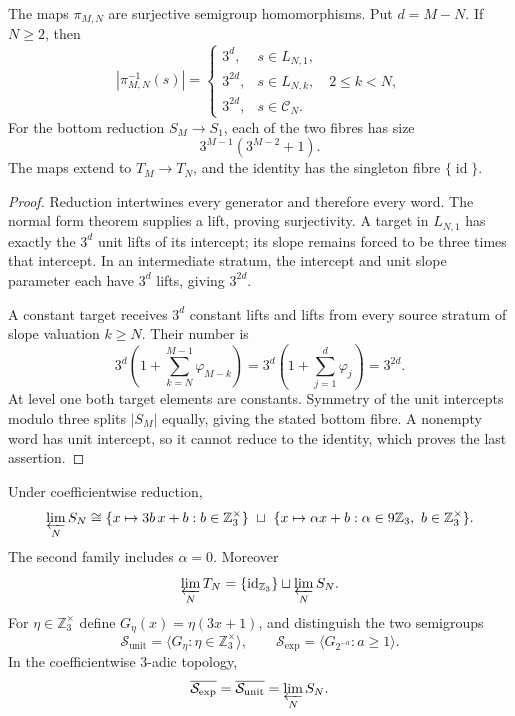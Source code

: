 \begin{theorem}
\label{thm:finite-residue-reduction-fibres}
The maps $\pi_{M,N}$ are surjective semigroup homomorphisms.  Put $d=M-N$.
If $N\geq2$, then
\begin{equation}
\label{eq:finite-residue-general-fibres}
 |\pi_{M,N}^{-1}(s)|=
 \begin{cases}
  3^d,&s\in L_{N,1},\\
  3^{2d},&s\in L_{N,k},\quad2\leq k<N,\\
  3^{2d},&s\in\mathcal C_N.
 \end{cases}
\end{equation}
For the bottom reduction $S_M\to S_1$, each of the two fibres has size
\[
 3^{M-1}(3^{M-2}+1).
\]
The maps extend to $T_M\to T_N$, and the identity has the singleton fibre
$\{\operatorname{id}\}$.
\end{theorem}

\begin{proof}
Reduction intertwines every generator and therefore every word.  The normal
form theorem supplies a lift, proving surjectivity.  A target in $L_{N,1}$
has exactly the $3^d$ unit lifts of its intercept; its slope remains forced to
be three times that intercept.  In an intermediate stratum, the intercept
and unit slope parameter each have $3^d$ lifts, giving $3^{2d}$.

A constant target receives $3^d$ constant lifts and lifts from every source
stratum of slope valuation $k\geq N$.  Their number is
\[
 3^d\left(1+\sum_{k=N}^{M-1}\varphi_{M-k}\right)
 =3^d\left(1+\sum_{j=1}^{d}\varphi_j\right)=3^{2d}.
\]
At level one both target elements are constants.  Symmetry of the unit
intercepts modulo three splits $|S_M|$ equally, giving the stated bottom
fibre.  A nonempty word has unit intercept, so it cannot reduce to the
identity, which proves the last assertion.
\end{proof}

\begin{theorem}
\label{thm:finite-residue-inverse-limit}
Under coefficientwise reduction,
\begin{equation}
\label{eq:finite-residue-inverse-limit}
 \varprojlim_N S_N
 \cong
 \{x\mapsto3b\,x+b:b\in\mathbb Z_3^\times\}
 \ \sqcup\
 \{x\mapsto\alpha x+b:
       \alpha\in9\mathbb Z_3,\ b\in\mathbb Z_3^\times\}.
\end{equation}
The second family includes $\alpha=0$.  Moreover
\[
 \varprojlim_N T_N
 =\{\operatorname{id}_{\mathbb Z_3}\}
  \sqcup\varprojlim_N S_N.
\]
For $\eta\in\mathbb Z_3^\times$ define
$G_\eta(x)=\eta(3x+1)$, and distinguish the two semigroups
\[
 \mathcal S_{\mathrm{unit}}
   =\langle G_\eta:\eta\in\mathbb Z_3^\times\rangle,
 \qquad
 \mathcal S_{\mathrm{exp}}
   =\langle G_{2^{-a}}:a\geq1\rangle.
\]
In the coefficientwise $3$-adic topology,
\[
 \overline{\mathcal S_{\mathrm{exp}}}
 =\overline{\mathcal S_{\mathrm{unit}}}
 =\varprojlim_N S_N.
\]
\end{theorem}

